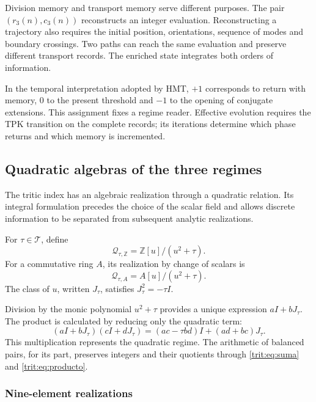 Division memory and transport memory serve different
purposes. The pair \((r_3(n),c_3(n))\) reconstructs an integer evaluation.
Reconstructing a trajectory also requires the initial position,
orientations, sequence of modes and boundary crossings. Two paths
can reach the same evaluation and preserve different transport
records. The enriched state integrates both orders of information.

In the temporal interpretation adopted by HMT, \(+1\) corresponds to
return with memory, \(0\) to the present threshold and \(-1\) to the opening of
conjugate extensions. This assignment fixes a regime reader.
Effective evolution requires the TPK transition on the complete
records; its iterations determine which phase returns and which memory is
incremented.

\subsection{Quadratic algebras of the three regimes}
\label{trit:cuadraticas}

The tritic index has an algebraic realization through a quadratic
relation. Its integral formulation precedes the choice of the scalar
field and allows discrete information to be separated from subsequent
analytic realizations.

\begin{definicion}
For \(\tau\in\mathcal T\), define
\[
 \mathcal Q_{\tau,\mathbb Z}=\mathbb Z[u]/(u^2+\tau).
\]
For a commutative ring \(A\), its realization by change of scalars is
\[
 \mathcal Q_{\tau,A}=A[u]/(u^2+\tau).
\]
The class of \(u\), written \(J_\tau\), satisfies
\(J_\tau^2=-\tau I\).
\end{definicion}

Division by the monic polynomial \(u^2+\tau\) provides a unique
expression \(aI+bJ_\tau\). The product is calculated by reducing only the
quadratic term:
\begin{equation}
 (aI+bJ_\tau)(cI+dJ_\tau)
 =(ac-\tau bd)I+(ad+bc)J_\tau.
\label{trit:eq:producto-cuadratico}
\end{equation}
This multiplication represents the quadratic regime. The arithmetic of
balanced pairs, for its part, preserves integers and their quotients
through \eqref{trit:eq:suma} and \eqref{trit:eq:producto}.

\subsubsection{Nine-element realizations}

